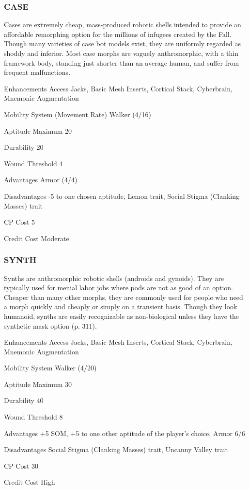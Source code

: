 \subsubsection{CASE}
Cases are extremely cheap, mass-produced robotic shells intended to provide an
affordable remorphing option for the millions of infugees created by the
Fall. Though many varieties of case bot models exist, they are uniformly
regarded as shoddy and inferior. Most case morphs are vaguely anthromorphic,
with a thin framework body, standing just shorter than an average human, and
suffer from frequent malfunctions.

\begin{description*}
\item[Enhancements] Access Jacks, Basic Mesh Inserts, Cortical Stack,
  Cyberbrain, Mnemonic Augmentation
\item[Mobility System] (Movement Rate) Walker (4/16) 
\item[Aptitude Maximum] 20 
\item[Durability] 20 
\item[Wound Threshold] 4 
\item[Advantages] Armor (4/4) 
\item[Disadvantages] -5 to one chosen aptitude, Lemon trait, Social Stigma
  (Clanking Masses) trait
\item[CP Cost] 5 
\item[Credit Cost] Moderate 
\end{description*}

\subsubsection{SYNTH}
Synths are anthromorphic robotic shells (androids and gynoids). They are
typically used for menial labor jobs where pods are not as good of an option.
Cheaper than many other morphs, they are commonly used for people who need a
morph quickly and cheaply or simply on a transient basis. Though they look
humanoid, synths are easily recognizable as non-biological unless they have the
synthetic mask option (p. 311).

\begin{description*}
\item[Enhancements] Access Jacks, Basic Mesh Inserts, Cortical Stack,
  Cyberbrain, Mnemonic Augmentation
\item[Mobility System] Walker (4/20) 
\item[Aptitude Maximum] 30 
\item[Durability] 40 
\item[Wound Threshold] 8 
\item[Advantages] +5 SOM, +5 to one other aptitude of the player’s choice,
  Armor 6/6
\item[Disadvantages] Social Stigma (Clanking Masses) trait, Uncanny Valley
  trait
\item[CP Cost] 30 
\item[Credit Cost] High 
\end{description*}

